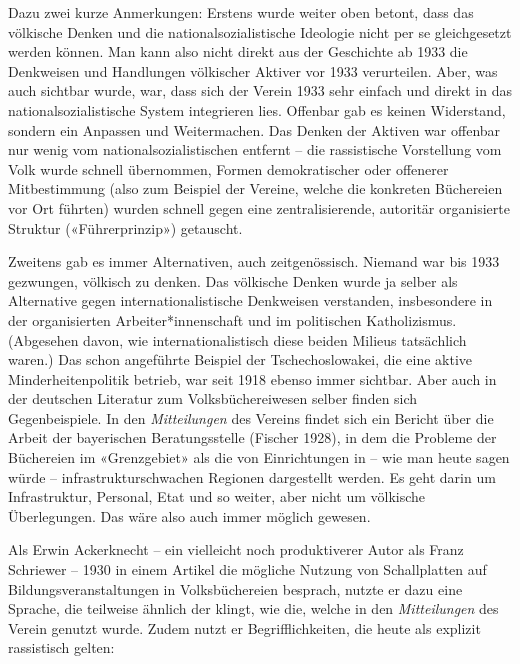 \documentclass[a4paper,
fontsize=11pt,
oneside,
numbers=noperiodatend,
parskip=half-,
bibliography=totoc,
final
]{scrartcl}
\begin{document}
Dazu zwei kurze Anmerkungen: Erstens wurde weiter oben betont, dass das
völkische Denken und die nationalsozialistische Ideologie nicht per se
gleichgesetzt werden können. Man kann also nicht direkt aus der
Geschichte ab 1933 die Denkweisen und Handlungen völkischer Aktiver vor
1933 verurteilen. Aber, was auch sichtbar wurde, war, dass sich der
Verein 1933 sehr einfach und direkt in das nationalsozialistische System
integrieren lies. Offenbar gab es keinen Widerstand, sondern ein
Anpassen und Weitermachen. Das Denken der Aktiven war offenbar nur wenig
vom nationalsozialistischen entfernt -- die rassistische Vorstellung vom
Volk wurde schnell übernommen, Formen demokratischer oder offenerer
Mitbestimmung (also zum Beispiel der Vereine, welche die konkreten
Büchereien vor Ort führten) wurden schnell gegen eine zentralisierende,
autoritär organisierte Struktur («Führerprinzip») getauscht.

Zweitens gab es immer Alternativen, auch zeitgenössisch. Niemand war bis
1933 gezwungen, völkisch zu denken. Das völkische Denken wurde ja selber
als Alternative gegen internationalistische Denkweisen verstanden,
insbesondere in der organisierten Arbeiter*innenschaft und im
politischen Katholizismus. (Abgesehen davon, wie internationalistisch
diese beiden Milieus tatsächlich waren.) Das schon angeführte Beispiel
der Tschechoslowakei, die eine aktive Minderheitenpolitik betrieb, war
seit 1918 ebenso immer sichtbar. Aber auch in der deutschen Literatur
zum Volksbüchereiwesen selber finden sich Gegenbeispiele. In den
\emph{Mitteilungen} des Vereins findet sich ein Bericht über die Arbeit
der bayerischen Beratungsstelle (Fischer 1928), in dem die Probleme der
Büchereien im «Grenzgebiet» als die von Einrichtungen in -- wie man
heute sagen würde -- infrastrukturschwachen Regionen dargestellt werden.
Es geht darin um Infrastruktur, Personal, Etat und so weiter, aber nicht
um völkische Überlegungen. Das wäre also auch immer möglich gewesen.

Als Erwin Ackerknecht -- ein vielleicht noch produktiverer Autor als
Franz Schriewer -- 1930 in einem Artikel die mögliche Nutzung von
Schallplatten auf Bildungsveranstaltungen in Volksbüchereien besprach,
nutzte er dazu eine Sprache, die teilweise ähnlich der klingt, wie die,
welche in den \emph{Mitteilungen} des Verein genutzt wurde. Zudem nutzt
er Begrifflichkeiten, die heute als explizit rassistisch gelten:
\end{document}
